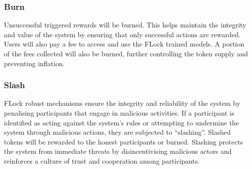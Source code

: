 \documentclass[conference]{IEEEtran}
\begin{document}

        






\subsubsection{Burn} 
Unsuccessful triggered rewards will be burned. This helps maintain the integrity and value of the system by ensuring that only successful actions are rewarded. Users will also pay a fee to access and use the FLock trained models. A portion of the fees collected will also be burned, further controlling the token supply and preventing inflation.




\subsubsection{Slash} \label{sec: slash}
FLock robust mechanisms ensure the integrity and reliability of the system by penalising participants that engage in malicious activities. If a participant is identified as acting against the system's rules or attempting to undermine the system through malicious actions, they are subjected to ``slashing''. Slashed tokens will be rewarded to the honest participants or burned. 
Slashing protects the system from immediate threats by disincentivising malicious actors and reinforces a culture of trust and cooperation among participants. 
\end{document}
